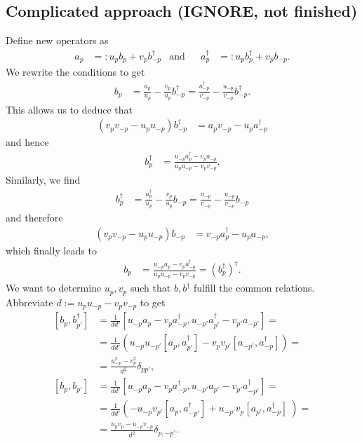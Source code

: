 \documentclass[english, parskip=full]{scrartcl}
\newcommand{\kla}{}
\newcommand{\klam}{}
\newcommand{\tecxt}{}
\begin{document}
\subsection{Complicated approach (IGNORE, not finished)}
Define new operators as
\begin{align}
a_p&=:u_pb_p+v_pb_{-p}^\dagger&\tecxt\text{and}&&a_p^\dagger&=:u_pb_p^\dagger+v_pb_{-p}.
\end{align}
We rewrite the conditions to get
\begin{align}
b_p&=\frac{a_p}{u_p}-\frac{v_p}{u_p}b_{-p}^\dagger =\frac{a_{-p}^\dagger}{v_{-p}}-\frac{u_{-p}}{v_{-p}}b_{-p}^\dagger.
\end{align}
This allows us to deduce that 
\begin{align}
(v_pv_{-p}-u_pu_{-p})b_{-p}^\dagger &=a_pv_{-p}-u_pa_{-p}^\dagger
\end{align}
and hence
\begin{align}
b_p^\dagger &=\frac{u_{-p}a_p^\dagger -v_pa_{-p}}{u_pu_{-p}-v_pv_{-p}}.
\end{align}
Similarly, we find
\begin{align}
b_p^\dagger &=\frac{a_p^\dagger}{u_p}-\frac{v_p}{u_p}b_{-p}=\frac{a_{-p}}{v_{-p}}-\frac{u_{-p}}{v_{-p}}b_{-p}
\end{align}
and therefore
\begin{align}
(v_pv_{-p}-u_pu_{-p})b_{-p}&=v_{-p}a_p^\dagger -u_pa_{-p},
\end{align}
which finally leads to 
\begin{align}
b_p&=\frac{u_{-p}a_p-v_pa_{-p}^\dagger}{u_pu_{-p}-v_pv_{-p}}=(b_p^\dagger)^\dagger.
\end{align}
We want to determine $u_p,v_p$ such that $b,b^\dagger$ fulfill the common relations. 
Abbreviate $d:=u_pu_{-p}-v_pv_{-p}$ to get
\begin{align}
\klam\left[ {b_p,b^\dagger_{p'}} \right]&=\frac{1}{dd'}\klam\left[ {u_{-p}a_p-v_pa_{-p}^\dagger,u_{-p'}a_{p'}^\dagger-v_{p'}a_{-p'}} \right]=\\
&=\frac{1}{dd'}\kla\left( {u_{-p}u_{-p'}\klam\left[ {a_p,a_{p'}^\dagger} \right]-v_pv_{p'}\klam\left[ {a_{-p'},a_{-p}^\dagger} \right]} \right)=\\
&=\frac{u_{-p}^2-v_p^2}{d^2}\delta_{pp'},\\
\klam\left[ {b_p,b_{p'}} \right]&=\frac{1}{dd'}\klam\left[ {u_{-p}a_p-v_pa_{-p}^\dagger,u_{-p'}a_{p'}-v_{p'}a_{-p'}^\dagger} \right]=\\
&=\frac{1}{dd'}\kla\left( -u_{-p}v_{p'}\klam\left[ a_p,a_{-p'}^\dagger \right]+u_{-p'}v_p\klam\left[ a_{p'},a_{-p}^\dagger \right]\ \right)=\\
&=\frac{u_pv_p-u_{-p}v_{-p}}{d^2}\delta_{p,-p'}.
\end{align}
\end{document}
